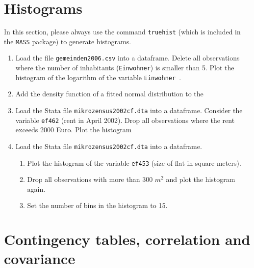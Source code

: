 \documentclass{article}
\begin{document}
\section{Histograms}

In this section, please always use the command \texttt{truehist} (which is
included in the \texttt{MASS} package) to generate histograms.

\begin{enumerate}
\item Load the file \texttt{gemeinden2006.csv} into a dataframe. Delete all
observations where the number of inhabitants (\texttt{Einwohner}) is smaller
than 5. Plot the histogram of the logarithm of the variable \texttt{Einwohner%
}.

\item Add the density function of a fitted normal distribution to the

\item Load the Stata file \texttt{mikrozensus2002cf.dta} into a dataframe.
Consider the variable \texttt{ef462} (rent in April 2002). Drop all
observations where the rent exceeds 2000 Euro. Plot the histogram

\item Load the Stata file \texttt{mikrozensus2002cf.dta} into a dataframe.

\begin{enumerate}
\item Plot the histogram of the variable \texttt{ef453} (size of flat in
square meters).

\item Drop all observations with more than $300$ $m^{2}$ and plot the
histogram again.

\item Set the number of bins in the histogram to 15.
\end{enumerate}
\end{enumerate}
\newpage


\section{Contingency tables, correlation and covariance}
\end{document}
